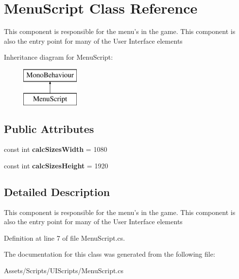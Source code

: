 \hypertarget{class_menu_script}{\section{Menu\+Script Class Reference}
\label{class_menu_script}
}


This component is responsible for the menu's in the game. This component is also the entry point for many of the User Interface elements  


Inheritance diagram for Menu\+Script\+:\begin{figure}[H]
\begin{center}
\leavevmode
\includegraphics[height=2.000000cm]{class_menu_script}
\end{center}
\end{figure}
\subsection*{Public Attributes}
\begin{DoxyCompactItemize}
\item 
\hypertarget{class_menu_script_ac781bbf7c61280806af93d05903a29e0}{const int {\bfseries calc\+Sizes\+Width} = 1080}\label{class_menu_script_ac781bbf7c61280806af93d05903a29e0}

\item 
\hypertarget{class_menu_script_a80df85343c146a33e5f64e6625907c35}{const int {\bfseries calc\+Sizes\+Height} = 1920}\label{class_menu_script_a80df85343c146a33e5f64e6625907c35}

\end{DoxyCompactItemize}


\subsection{Detailed Description}
This component is responsible for the menu's in the game. This component is also the entry point for many of the User Interface elements 



Definition at line 7 of file Menu\+Script.\+cs.



The documentation for this class was generated from the following file\+:\begin{DoxyCompactItemize}
\item 
Assets/\+Scripts/\+U\+I\+Scripts/Menu\+Script.\+cs\end{DoxyCompactItemize}
